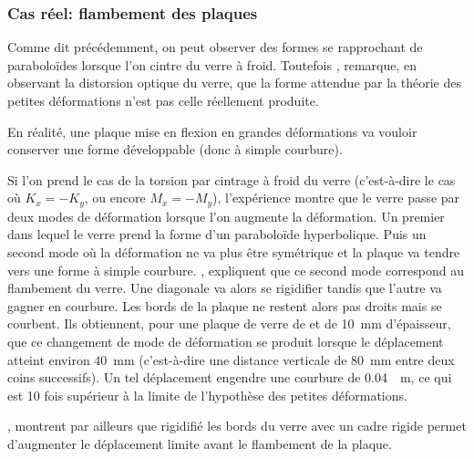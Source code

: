 \documentclass[11pt,titlepage]{article}
\begin{document}
\subsubsection{Cas réel: flambement des plaques}

Comme dit précédemment, on peut observer des formes se rapprochant de paraboloïdes lorsque l'on cintre du verre à froid. Toutefois \Textcite{staaks}, remarque, en observant la distorsion optique du verre, que la forme attendue par la théorie des petites déformations n'est pas celle réellement produite.

En réalité, une plaque mise en flexion en grandes déformations va vouloir conserver une forme développable (donc à simple courbure). 

Si l'on prend le cas de la torsion par cintrage à froid du verre (c'est-à-dire le cas où $K_x = -K_y$, ou encore $M_x = -M_y$), l'expérience montre que le verre passe par deux modes de déformation lorsque l'on augmente la déformation. Un premier dans lequel le verre prend la forme d'un paraboloïde hyperbolique. Puis un second mode où la déformation ne va plus être symétrique et la plaque va tendre vers une forme à simple courbure. \Textcite{buckling_cold}, expliquent que ce second mode correspond au flambement du verre. Une diagonale va alors se rigidifier tandis que l'autre va gagner en courbure. Les bords de la plaque ne restent alors pas droits mais se courbent. Ils obtiennent, pour une plaque de verre de  et de \qty{10}{\milli\metre} d'épaisseur, que ce changement de mode de déformation se produit lorsque le déplacement atteint environ \qty{40}{\milli\metre} (c'est-à-dire une distance verticale de \qty{80}{\milli\metre} entre deux coins successifs). Un tel déplacement engendre une courbure de \qty{0.04}{\per\metre}, ce qui est 10 fois supérieur à la limite de l'hypothèse des petites déformations. 

\Textcite{buckling_cold}, montrent par ailleurs que rigidifié les bords du verre avec un cadre rigide permet d'augmenter le déplacement limite avant le flambement de la plaque. 
\end{document}
